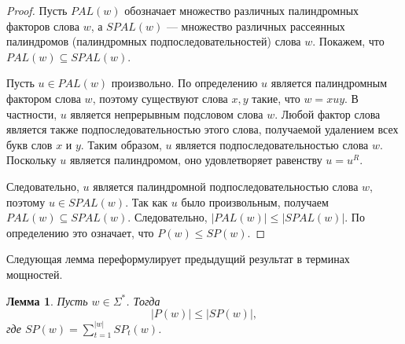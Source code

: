 \documentclass[a4paper,14pt]{extreport}
\theoremstyle{plain}
\newtheorem{lemma}{Лемма}[section]
\theoremstyle{definition}
\theoremstyle{remark}
\begin{document}
\begin{proof}
	Пусть $PAL(w)$ обозначает множество различных палиндромных факторов слова $w$, а $SPAL(w)$ --- множество различных рассеянных палиндромов (палиндромных подпоследовательностей) слова $w$. Покажем, что $PAL(w) \subseteq SPAL(w)$.
	
	Пусть $u \in PAL(w)$ произвольно. По определению $u$ является палиндромным фактором слова $w$, поэтому существуют слова $x,y$ такие, что $w = xuy$. В частности, $u$ является непрерывным подсловом слова $w$. Любой фактор слова является также подпоследовательностью этого слова, получаемой удалением всех букв слов $x$ и $y$. Таким образом, $u$ является подпоследовательностью слова $w$. Поскольку $u$ является палиндромом, оно удовлетворяет равенству $u = u^R$.
	
	Следовательно, $u$ является палиндромной подпоследовательностью слова $w$, поэтому $u \in SPAL(w)$. Так как $u$ было произвольным, получаем $PAL(w) \subseteq SPAL(w)$.
	Следовательно, $|PAL(w)| \leq |SPAL(w)|$. По определению это означает, что $P(w) \leq SP(w)$.
\end{proof}

Следующая лемма переформулирует предыдущий результат в терминах мощностей.

\begin{lemma}\label{pal_spal}
	Пусть $w \in \Sigma^*$. Тогда
	\begin{equation}
		|P(w)| \leq |SP(w)|,
	\end{equation}
	где $SP(w)=\sum_{t=1}^{|w|} SP_t(w)$.
\end{lemma}
\end{document}
